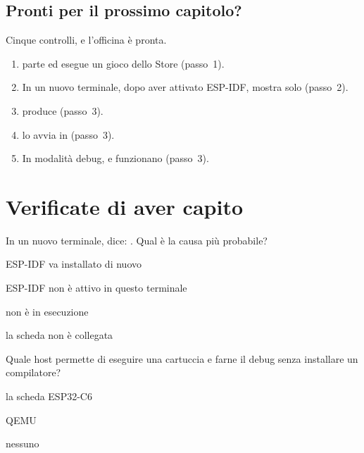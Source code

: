 \subsection{Pronti per il prossimo capitolo?}

Cinque controlli, e l'officina è pronta.

\begin{enumerate}
\item \prgqt parte ed esegue un gioco dello Store (passo~1).
\item In un nuovo terminale, dopo aver attivato ESP-IDF,  mostra
  solo  (passo~2).
\item {} produce  (passo~3).
\item {} lo avvia in \prgqt (passo~3).
\item In modalità debug,  e  funzionano (passo~3).
\end{enumerate}





\section{Verificate di aver capito}

\begin{quiz}{In un nuovo terminale,  dice:
. Qual è la causa più probabile?}
\item ESP-IDF va installato di nuovo
\item ESP-IDF non è attivo in questo terminale
\item \prgqt non è in esecuzione
\item la scheda non è collegata
\end{quiz}

\begin{quiz}{Quale host permette di eseguire una cartuccia e farne il debug senza installare un compilatore?}
\item la scheda ESP32-C6
\item QEMU
\item \prgqt
\item nessuno
\end{quiz}

